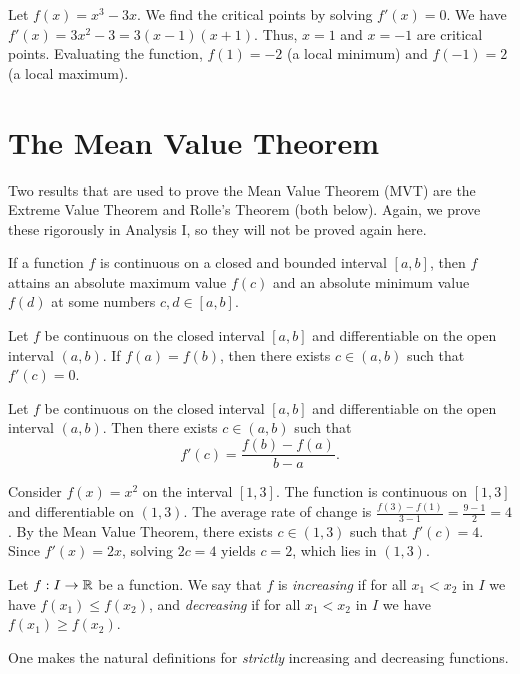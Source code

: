 \documentclass[../calculus.tex]{subfiles}
\begin{document}
\begin{example}
    Let $f(x) = x^3 - 3x$. We find the critical points by solving $f'(x) = 0$. We have $f'(x) = 3x^2 - 3 = 3(x-1)(x+1)$. Thus, $x = 1$ and $x = -1$ are critical points. Evaluating the function, $f(1) = -2$ (a local minimum) and $f(-1) = 2$ (a local maximum).
\end{example}

\section{The Mean Value Theorem}

Two results that are used to prove the Mean Value Theorem (MVT) are the Extreme Value Theorem and Rolle's Theorem (both below). Again, we prove these rigorously in Analysis I, so they will not be proved again here.

\begin{theorem}
    \begin{shaded*}
        If a function $f$ is continuous on a closed and bounded interval $[a,b]$, then $f$ attains an absolute maximum value $f(c)$ and an absolute minimum value $f(d)$ at some numbers $c, d \in [a,b]$.
    \end{shaded*}
\end{theorem}

\begin{theorem}
    \begin{shaded*}
        Let $f$ be continuous on the closed interval $[a,b]$ and differentiable on the open interval $(a,b)$. If $f(a) = f(b)$, then there exists $c \in (a,b)$ such that $f'(c) = 0$.
    \end{shaded*}
\end{theorem}

\begin{theorem}
    \begin{shaded*}
        Let $f$ be continuous on the closed interval $[a,b]$ and differentiable on the open interval $(a,b)$. Then there exists $c \in (a,b)$ such that
        \[f'(c) = \frac{f(b) - f(a)}{b - a}.\]
    \end{shaded*}
\end{theorem}

\begin{example}
    Consider $f(x) = x^2$ on the interval $[1, 3]$. The function is continuous on $[1,3]$ and differentiable on $(1,3)$. The average rate of change is $\frac{f(3)-f(1)}{3-1} = \frac{9-1}{2} = 4$. By the Mean Value Theorem, there exists $c \in (1,3)$ such that $f'(c) = 4$. Since $f'(x) = 2x$, solving $2c = 4$ yields $c = 2$, which lies in $(1,3)$.
\end{example}
\begin{definition}
    \begin{shaded*}
        Let $f:I\to\mathbb{R}$ be a function. We say that $f$ is \textit{increasing} if for all $x_1<x_2$ in $I$ we have $f(x_1)\le f(x_2)$, and \textit{decreasing} if for all $x_1<x_2$ in $I$ we have $f(x_1)\ge f(x_2)$.
    \end{shaded*}
\end{definition}
One makes the natural definitions for \textit{strictly} increasing and decreasing functions. 
\end{document}
